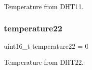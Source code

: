 Temperature from D\+H\+T11. 

\mbox{\label{main_8c_ab0ad7bfc871f103f70eb9d1901b7db07}} 
\subsubsection{temperature22}
{\footnotesize\ttfamily uint16\+\_\+t temperature22 = 0}



Temperature from D\+H\+T22. 

